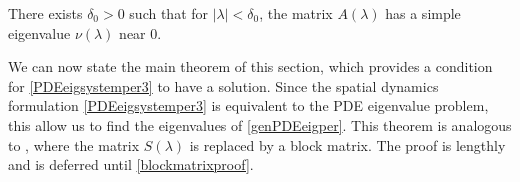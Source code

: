 \documentclass[thesis.tex]{subfiles}
\begin{document}
\begin{lemma}\label{nulambdalemmasimple}
There exists $\delta_0 > 0$ such that for $|\lambda| < \delta_0$, the matrix $A(\lambda)$ has a simple eigenvalue $\nu(\lambda)$ near 0.
\end{lemma}

We can now state the main theorem of this section, which provides a condition for \cref{PDEeigsystemper3} to have a solution. Since the spatial dynamics formulation \cref{PDEeigsystemper3} is equivalent to the PDE eigenvalue problem, this allow us to find the eigenvalues of \cref{genPDEeigper}. This theorem is analogous to \cite[Theorem 2]{Sandstede1998}, where the matrix $S(\lambda)$ is replaced by a block matrix. The proof is lengthly and is deferred until \cref{blockmatrixproof}.

\end{document}
